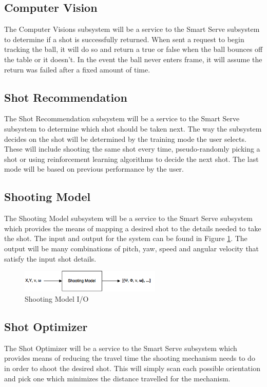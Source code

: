 \documentclass[11pt]{article}
\begin{document}
\subsection{Computer Vision}
The Computer Visions subsystem will be a service to the Smart Serve subsystem to determine if a shot is successfully returned. When sent a request to begin tracking the ball, it will do so and return a true or false when the ball bounces off the table or it doesn't. In the event the ball never enters frame, it will assume the return was failed after a fixed amount of time.

\subsection{Shot Recommendation}
The Shot Recommendation subsystem will be a service to the Smart Serve subsystem to determine which shot should be taken next. The way the subsystem decides on the shot will be determined by the training mode the user selects. These will include shooting the same shot every time, pseudo-randomly picking a shot or using reinforcement learning algorithms to decide the next shot. The last mode will be based on previous performance by the user.

\subsection{Shooting Model}
The Shooting Model subsystem will be a service to the Smart Serve subsystem which provides the means of mapping a desired shot to the details needed to take the shot. The input and output for the system can be found in Figure \ref{fig:shotmodel}. The output will be many combinations of pitch, yaw, speed and angular velocity that satisfy the input shot details. 
\begin{figure}[htbp]
   \centering
   \includegraphics[width=0.6\textwidth]{img/ShotModel.png} %
   \caption{Shooting Model I/O}
   \label{fig:shotmodel}
\end{figure}
\subsection{Shot Optimizer}
The Shot Optimizer will be a service to the Smart Serve subsystem which provides means of reducing the travel time the shooting mechanism needs to do in order to shoot the desired shot. This will simply scan each possible orientation and pick one which minimizes the distance travelled for the mechanism.
\end{document}
